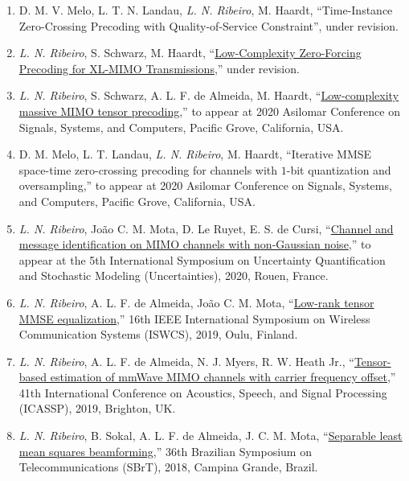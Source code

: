 \begin{enumerate}
	\item D. M. V. Melo, L. T. N. Landau, \emph{L. N. Ribeiro}, M. Haardt, ``Time-Instance Zero-Crossing Precoding with Quality-of-Service Constraint'', under revision.

	\item \emph{L. N. Ribeiro}, S. Schwarz, M. Haardt, ``\href{https://arxiv.org/abs/2103.00971}{Low-Complexity Zero-Forcing Precoding for XL-MIMO Transmissions},'' under revision.

	\item \emph{L. N. Ribeiro}, S. Schwarz, A. L. F. de Almeida, M. Haardt, ``\href{https://arxiv.org/abs/2009.09729}{Low-complexity massive MIMO tensor precoding},'' to appear at 2020 Asilomar Conference on Signals, Systems, and Computers, Pacific Grove, California, USA.

	\item D. M. Melo, L. T. Landau, \emph{L. N. Ribeiro}, M. Haardt, ``Iterative MMSE space-time zero-crossing precoding for channels with $1$-bit quantization and oversampling,'' to appear at 2020 Asilomar Conference on Signals, Systems, and Computers, Pacific Grove, California, USA.

	\item \emph{L. N. Ribeiro}, Jo\~ao C. M. Mota, D. Le Ruyet, E. S. de Cursi, ``\href{https://www5.tu-ilmenau.de/nt/generic/paper_pdfs/Ribeiro2020.pdf}{Channel and message identification on MIMO channels with non-Gaussian noise},'' to appear at the 5th International Symposium on Uncertainty Quantification and Stochastic Modeling (Uncertainties), 2020, Rouen, France.
	
	\item \emph{L. N. Ribeiro}, A. L. F. de Almeida, Jo\~ao C. M. Mota, ``\href{https://arxiv.org/abs/1912.08317}{Low-rank tensor MMSE equalization},'' 16th IEEE International Symposium on Wireless Communication Systems (ISWCS), 2019, Oulu, Finland.
	
	\item \emph{L. N. Ribeiro}, A. L. F. de Almeida, N. J. Myers, R. W. Heath Jr., ``\href{https://doi.org/10.1109/ICASSP.2019.8683496}{Tensor-based estimation of mmWave MIMO channels with carrier frequency offset},'' 41th International Conference on Acoustics, Speech, and Signal Processing (ICASSP), 2019, Brighton, UK.
	
	\item \emph{L. N. Ribeiro}, B. Sokal, A. L. F. de Almeida, J. C. M. Mota, ``\href{https://github.com/lnribeiro/lnribeiro.github.io/blob/master/assets/pdf/sbrt18.pdf}{Separable least mean squares beamforming},'' 36th Brazilian Symposium on Telecommunications (SBrT), 2018, Campina Grande, Brazil.
	

\end{enumerate}
